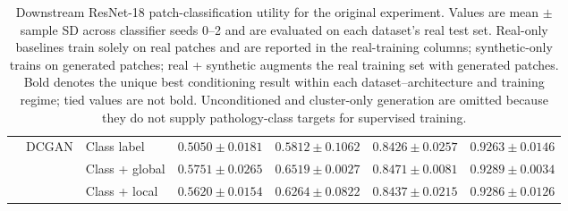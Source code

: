 \begin{table}[htbp]
\begin{tabular}{lllcccc}
\cmidrule(lr){2-7}
 & \multirow{3}{*}{DCGAN}
 & Class label    & $0.5050 \pm 0.0181$ & $0.5812 \pm 0.1062$ & $0.8426 \pm 0.0257$ & $0.9263 \pm 0.0146$ \\
 & & Class + global & $\mathbf{0.5751 \pm 0.0265}$ & $\mathbf{0.6519 \pm 0.0027}$ & $\mathbf{0.8471 \pm 0.0081}$ & $\mathbf{0.9289 \pm 0.0034}$ \\
 & & Class + local  & $0.5620 \pm 0.0154$ & $0.6264 \pm 0.0822$ & $0.8437 \pm 0.0215$ & $0.9286 \pm 0.0126$ \\
\bottomrule
\end{tabular}
\caption{Downstream ResNet-18 patch-classification utility for the original experiment. Values are mean $\pm$ sample SD across classifier seeds 0--2 and are evaluated on each dataset's real test set. Real-only baselines train solely on real patches and are reported in the real-training columns; synthetic-only trains on generated patches; real + synthetic augments the real training set with generated patches. Bold denotes the unique best conditioning result within each dataset--architecture and training regime; tied values are not bold. Unconditioned and cluster-only generation are omitted because they do not supply pathology-class targets for supervised training.}
\label{tab:original-utility-by-dataset-architecture}
\end{table}
